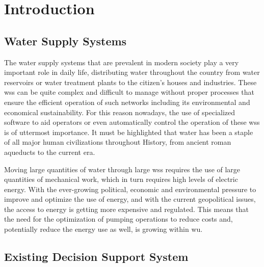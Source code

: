 \chapter{Introduction}\label{intro}




\section{Water Supply Systems}\label{intro:s:water-supply-systems}

The water supply systems that are prevalent in modern society play a very important role in daily life, distributing water throughout the country from water reservoirs or water treatment plants to the citizen's houses and industries. These \gls{wss} can be quite complex and difficult to manage without proper processes that ensure the efficient operation of such networks including its environmental and economical sustainability. For this reason nowadays, the use of specialized software to aid operators or even automatically control the operation of these \gls{wss} is of uttermost importance. It must be highlighted that water has been a staple of all major human civilizations throughout History, from ancient roman aqueducts to the current era.

Moving large quantities of water through large \gls{wss} requires the use of large quantities of mechanical work, which in turn requires high levels of electric energy. With the ever-growing political, economic and environmental pressure to improve and optimize the use of energy, and with the current geopolitical issues, the access to energy is getting more expensive and regulated. This means that the need for the optimization of pumping operations to reduce costs and, potentially reduce the energy use as well, is growing within \gls{wu}.

\section{Existing Decision Support System}\label{intro:s:existing-decision-support-system}

